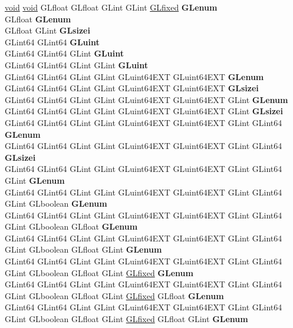 \begin{DoxyCompactItemize}
\begin{tabbing}
\>\hyperlink{interfacevoid}{void} \hyperlink{interfacevoid}{void} GLfloat GLfloat GLint GLint \hyperlink{glheader_8h_ad6d3fa892df40dedf48ee6d84529ae5e}{GLfixed} {\bfseries GLenum}\\
\>GLfloat {\bfseries GLenum}\\
\>GLfloat GLint {\bfseries GLsizei}\\
\>GLint64 GLint64 {\bfseries GLuint}\\
\>GLint64 GLint64 GLint {\bfseries GLuint}\\
\>GLint64 GLint64 GLint GLint {\bfseries GLuint}\\
\>GLint64 GLint64 GLint GLint GLuint64EXT GLuint64EXT {\bfseries GLenum}\\
\>GLint64 GLint64 GLint GLint GLuint64EXT GLuint64EXT {\bfseries GLsizei}\\
\>GLint64 GLint64 GLint GLint GLuint64EXT GLuint64EXT GLint {\bfseries GLenum}\\
\>GLint64 GLint64 GLint GLint GLuint64EXT GLuint64EXT GLint {\bfseries GLsizei}\\
\>GLint64 GLint64 GLint GLint GLuint64EXT GLuint64EXT GLint GLint64 {\bfseries GLenum}\\
\>GLint64 GLint64 GLint GLint GLuint64EXT GLuint64EXT GLint GLint64 {\bfseries GLsizei}\\
\>GLint64 GLint64 GLint GLint GLuint64EXT GLuint64EXT GLint GLint64 GLint {\bfseries GLenum}\\
\>GLint64 GLint64 GLint GLint GLuint64EXT GLuint64EXT GLint GLint64 GLint GLboolean {\bfseries GLenum}\\
\>GLint64 GLint64 GLint GLint GLuint64EXT GLuint64EXT GLint GLint64 GLint GLboolean GLfloat {\bfseries GLenum}\\
\>GLint64 GLint64 GLint GLint GLuint64EXT GLuint64EXT GLint GLint64 GLint GLboolean GLfloat GLint {\bfseries GLenum}\\
\>GLint64 GLint64 GLint GLint GLuint64EXT GLuint64EXT GLint GLint64 GLint GLboolean GLfloat GLint \hyperlink{glheader_8h_ad6d3fa892df40dedf48ee6d84529ae5e}{GLfixed} {\bfseries GLenum}\\
\>GLint64 GLint64 GLint GLint GLuint64EXT GLuint64EXT GLint GLint64 GLint GLboolean GLfloat GLint \hyperlink{glheader_8h_ad6d3fa892df40dedf48ee6d84529ae5e}{GLfixed} GLfloat {\bfseries GLenum}\\
\>GLint64 GLint64 GLint GLint GLuint64EXT GLuint64EXT GLint GLint64 GLint GLboolean GLfloat GLint \hyperlink{glheader_8h_ad6d3fa892df40dedf48ee6d84529ae5e}{GLfixed} GLfloat GLint {\bfseries GLenum}\\

\end{tabbing}
\end{DoxyCompactItemize}
